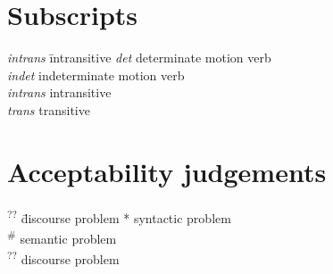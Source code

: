 \section*{Subscripts}
\begin{tabbing}
\textit{intrans} \hspace{1em} \= intransitive\kill
\textit{det}     \> determinate motion verb\\
\textit{indet}   \> indeterminate motion verb\\
\textit{intrans} \> intransitive\\
\textit{trans}   \> transitive
\end{tabbing}

\section*{Acceptability judgements}
\begin{tabbing}
\textsuperscript{??} \hspace{1em}\= discourse problem\kill
* \> syntactic problem\\
\textsuperscript{\#} \> semantic problem\\
\textsuperscript{??} \> discourse problem
\end{tabbing}
